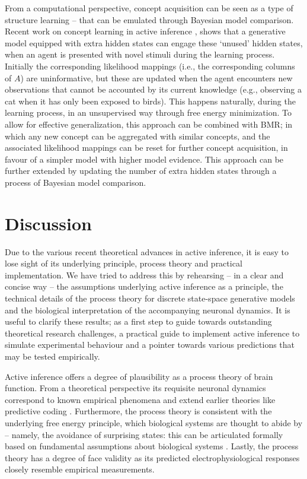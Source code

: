 \documentclass[review,12pt,authoryear]{elsarticle}
\begin{document}
From a computational perspective, concept acquisition can be seen as a type of structure learning \citep{gershmanLearningLatentStructure2010,tervoNeuralImplementationStructure2016} – that can be emulated through Bayesian model comparison. Recent work on concept learning in active inference \citep{smithActiveInferenceModel2019}, shows that a generative model equipped with extra hidden states can engage these ‘unused’ hidden states, when an agent is presented with novel stimuli during the learning process. Initially the corresponding likelihood mappings (i.e., the corresponding columns of $A$) are uninformative, but these are updated when the agent encounters new observations that cannot be accounted by its current knowledge (e.g., observing a cat when it has only been exposed to birds). This happens naturally, during the learning process, in an unsupervised way through free energy minimization. To allow for effective generalization, this approach can be combined with BMR; in which any new concept can be aggregated with similar concepts, and the associated likelihood mappings can be reset for further concept acquisition, in favour of a simpler model with higher model evidence. This approach can be further extended by updating the number of extra hidden states through a process of Bayesian model comparison.

\section{Discussion}
Due to the various recent theoretical advances in active inference, it is easy to lose sight of its underlying principle, process theory and practical implementation. We have tried to address this by rehearsing – in a clear and concise way – the assumptions underlying active inference as a principle, the technical details of the process theory for discrete state-space generative models and the biological interpretation of the accompanying neuronal dynamics. It is useful to clarify these results; as a first step to guide towards outstanding theoretical research challenges, a practical guide to implement active inference to simulate experimental behaviour and a pointer towards various predictions that may be tested empirically.

Active inference offers a degree of plausibility as a process theory of brain function. From a theoretical perspective its requisite neuronal dynamics correspond to known empirical phenomena and extend earlier theories like predictive coding \citep{fristonFreeenergyPrincipleUnified2010,raoPredictiveCodingVisual1999,bastosCanonicalMicrocircuitsPredictive2012}. Furthermore, the process theory is consistent with the underlying free energy principle, which biological systems are thought to abide by – namely, the avoidance of surprising states: this can be articulated formally based on fundamental assumptions about biological systems \citep{parrMarkovBlanketsInformation2019,fristonFreeEnergyPrinciple2019}. Lastly, the process theory has a degree of face validity as its predicted electrophysiological responses closely resemble empirical measurements.
\end{document}
